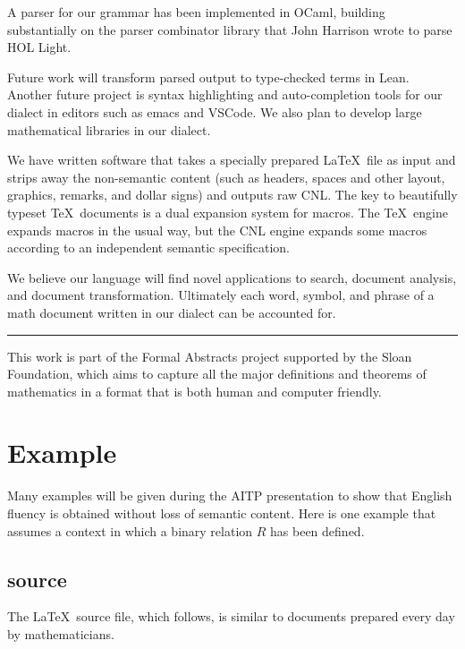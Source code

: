 \documentclass{easychair}
\renewcommand{\~}{\ }
\renewcommand{\_}{\textunderscore}
\begin{document}
A parser for our grammar has been implemented in OCaml, building substantially on
the parser combinator library that John Harrison wrote to parse HOL
Light.   

Future work will transform parsed output to type-checked
terms in Lean.  Another future project is syntax highlighting and auto-completion tools 
for our
dialect in editors such as emacs and VSCode. We also plan to develop large
mathematical libraries in our dialect.

We have written software that takes a specially prepared
\LaTeX\ file as input and strips away the non-semantic content  
(such as headers, spaces and other layout, graphics,
remarks, and dollar signs) and
outputs raw CNL.
The key to beautifully typeset \TeX\ documents is a
dual expansion system for macros.  The \TeX\ engine expands macros in
the usual way, but the CNL engine expands some macros according to an
independent semantic specification.   

We believe our language will find novel applications to search, document
analysis, and document transformation.  
Ultimately each word, symbol, and phrase of a math document written in our dialect can be 
accounted for. 

\bigskip
\noindent\rule{2cm}{0.4pt}

This work is part of the Formal Abstracts project supported by the Sloan Foundation, 
which aims to capture all the major
definitions and theorems of mathematics in a format that is both human and computer
friendly.



\newpage
\section{Example}


Many examples will be given during the AITP presentation to show that English
fluency is obtained without loss of semantic content.  Here is one example that
assumes a context in which a binary relation $R$ has been defined.

\subsection{source} The \LaTeX\ source file, which follows, is similar to documents prepared every day
by mathematicians.
\end{document}
